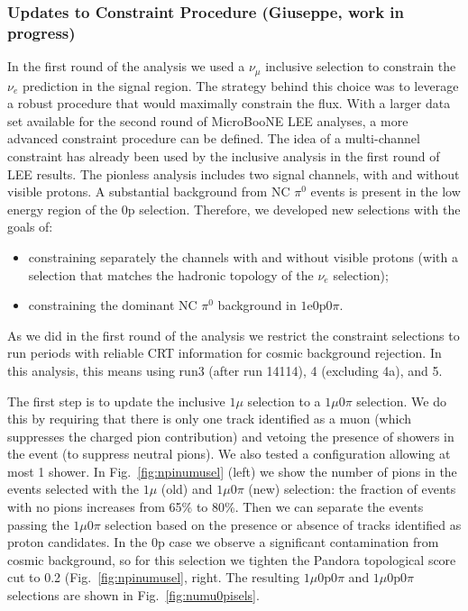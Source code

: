 \subsubsection{Updates to Constraint Procedure (Giuseppe, work in progress)}
\label{sec:construpd}

In the first round of the analysis we used a $\nu_\mu$ inclusive selection to constrain the $\nu_e$ prediction in the signal region. The strategy behind this choice was to leverage a robust procedure that would maximally constrain the flux. With a larger data set available for the second round of MicroBooNE LEE analyses, a more advanced constraint procedure can be defined. The idea of a multi-channel constraint has already been used by the inclusive analysis in the first round of LEE results. The pionless analysis includes two signal channels, with and without visible protons. A substantial background from NC $\pi^0$ events is present in the low energy region of the 0p selection. Therefore, we developed new selections with the goals of:
\begin{itemize}
    \item constraining separately the channels with and without visible protons (with a selection that matches the hadronic topology of the $\nu_e$ selection);
    \item constraining the dominant NC $\pi^0$ background in $1\mathrm{e}0\mathrm{p}0\pi.$
\end{itemize} 

As we did in the first round of the analysis we restrict the constraint selections to run periods with reliable CRT information for cosmic background rejection. In this analysis, this means using run3 (after run 14114), 4 (excluding 4a), and 5.

The first step is to update the inclusive $1\mu$ selection to a $1\mu0\pi$ selection. We do this by requiring that there is only one track identified as a muon (which suppresses the charged pion contribution) and vetoing the presence of showers in the event (to suppress neutral pions). We also tested a configuration allowing at most 1 shower. In Fig.~\ref{fig:npinumusel} (left) we show the number of pions in the events selected with the $1\mu$ (old) and $1\mu0\pi$ (new) selection: the fraction of events with no pions increases from 65\% to 80\%. Then we can separate the events passing the $1\mu0\pi$ selection based on the presence or absence of tracks identified as proton candidates. In the 0p case we observe a significant contamination from cosmic background, so for this selection we tighten the Pandora topological score cut to 0.2 (Fig.~\ref{fig:npinumusel}, right. The resulting $1\mu0\mathrm{p}0\pi$ and $1\mu0\mathrm{p}0\pi$ selections are shown in Fig.~\ref{fig:numu0pisels}.

